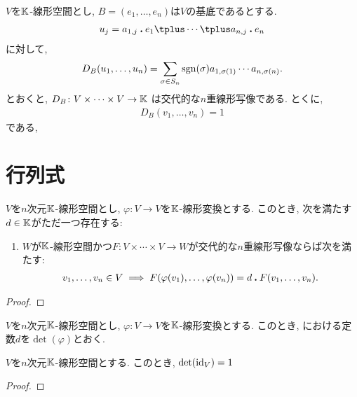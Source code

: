 \begin{example}
  $V$を$\mathbb{K}$-線形空間とし,
  $B=(e_1,\ldots,e_n)$は$V$の基底であるとする.
  \begin{align*}
    u_j= a_{1,j}\act e_1\plus \cdots \plus a_{n,j}\act e_n
  \end{align*}
  に対して,
  \begin{align*}
    D_B(u_{1},\ldots,u_{n})
    =
    \sum_{\sigma\in S_n} \operatorname{sgn}(\sigma)a_{1,\sigma(1)}\cdots a_{n,\sigma(n)}.
  \end{align*}
  とおくと, $D_B\colon V\times \cdots \times V \to \mathbb{K}$
  は交代的な$n$重線形写像である.
  とくに,
  \begin{align*}
    D_B(v_{1},\ldots,v_{n})=1
  \end{align*}
  である,
\end{example}

\section{行列式}

\begin{prop}
  \label{thm:universalprop:det}
  $V$を$n$次元$\mathbb{K}$-線形空間とし,
  $\varphi\colon V \to V$を$\mathbb{K}$-線形変換とする.
  このとき, 次を満たす$d\in\mathbb{K}$がただ一つ存在する:
  \begin{enumerate}
  \item $W$が$\mathbb{K}$-線形空間かつ$F\colon V\times\cdots \times V\to W$が交代的な$n$重線形写像ならば次を満たす:
    \begin{align*}
      v_1,\ldots, v_n \in V\implies F(\varphi(v_1),\ldots,\varphi(v_n))=d \mathbin{\boldsymbol{.}} F(v_1,\ldots,v_n).
    \end{align*}
  \end{enumerate}
\end{prop}
\begin{proof}\end{proof}

\begin{definition}
  $V$を$n$次元$\mathbb{K}$-線形空間とし,
  $\varphi\colon V \to V$を$\mathbb{K}$-線形変換とする.
  このとき,
  における定数$d$を$\det(\varphi)$とおく.
\end{definition}

\begin{prop}
  $V$を$n$次元$\mathbb{K}$-線形空間とする.
  このとき, $\det(\operatorname{id}_V)=1$
\end{prop}
\begin{proof}\end{proof}

